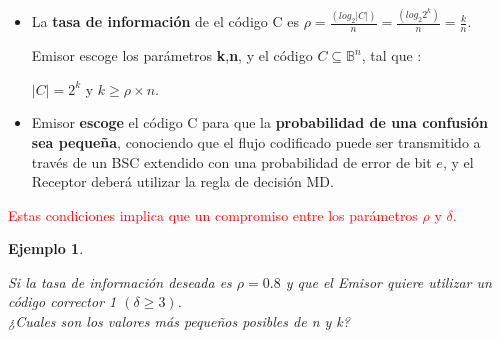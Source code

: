 \documentclass{beamer}
\theoremstyle{plain}
\theoremstyle{example}
\theoremstyle{example}
\newtheorem{ejemplo} [Ejemplo] {Ejemplo}
\begin{document}
\begin{frame}  \small  
\begin{itemize} 

 \item La \textbf{tasa de información} de el código C es $ \rho = \frac{(log_2 |C|)}{n} = \frac{(log_2 2^k)}{n} = \frac{k}{n} $. 
 
 Emisor escoge los parámetros \textbf{k},\textbf{n}, y el código $C\subseteq \mathbb{B}^n$, tal que :

\begin{center}
$|C|=2^k$ y $k\geq \rho \times n$.
\end{center} 

 \item  Emisor \textbf{escoge} el código C para que la \textbf{probabilidad de una confusión sea pequeña}, conociendo que el flujo codificado puede ser transmitido a través de un BSC extendido con una probabilidad de error de bit $e$, y el Receptor deberá utilizar la regla de decisión MD. 

\end{itemize}

\vspace{0.3cm}
\begin{center}
\textcolor{red}{Estas condiciones implica que un compromiso entre los parámetros $\rho$ y $\delta$.}     
\end{center}


\end{frame} 



\begin{frame}  \small  
\begin{ejemplo} 	\label{ej:codeCor1}

Si la tasa de información deseada es $\rho =0.8$ y que el Emisor quiere utilizar un código corrector 1 $(\delta\geq3)$.\\
\vspace{0.2cm}
¿Cuales son los valores más pequeños posibles de n y k?\\
\end{ejemplo}
\end{frame} 
\end{document}
